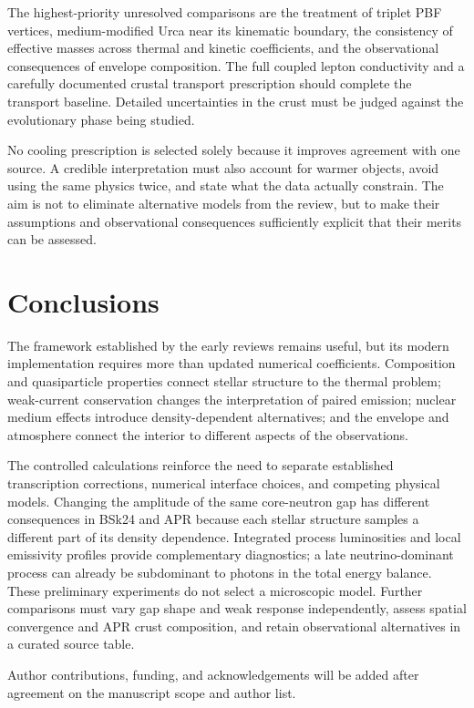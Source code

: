\documentclass{aa}
\begin{document}
The highest-priority unresolved comparisons are the treatment of triplet PBF vertices, medium-modified Urca near its kinematic boundary, the consistency of effective masses across thermal and kinetic coefficients, and the observational consequences of envelope composition. The full coupled lepton conductivity and a carefully documented crustal transport prescription should complete the transport baseline. Detailed uncertainties in the crust must be judged against the evolutionary phase being studied.

No cooling prescription is selected solely because it improves agreement with one source. A credible interpretation must also account for warmer objects, avoid using the same physics twice, and state what the data actually constrain. The aim is not to eliminate alternative models from the review, but to make their assumptions and observational consequences sufficiently explicit that their merits can be assessed.

\section{Conclusions}
The framework established by the early reviews remains useful, but its modern implementation requires more than updated numerical coefficients. Composition and quasiparticle properties connect stellar structure to the thermal problem; weak-current conservation changes the interpretation of paired emission; nuclear medium effects introduce density-dependent alternatives; and the envelope and atmosphere connect the interior to different aspects of the observations.

The controlled calculations reinforce the need to separate established transcription corrections, numerical interface choices, and competing physical models. Changing the amplitude of the same core-neutron gap has different consequences in BSk24 and APR because each stellar structure samples a different part of its density dependence. Integrated process luminosities and local emissivity profiles provide complementary diagnostics; a late neutrino-dominant process can already be subdominant to photons in the total energy balance. These preliminary experiments do not select a microscopic model. Further comparisons must vary gap shape and weak response independently, assess spatial convergence and APR crust composition, and retain observational alternatives in a curated source table.

\begin{acknowledgements}
Author contributions, funding, and acknowledgements will be added after agreement on the manuscript scope and author list.
\end{acknowledgements}


\end{document}
